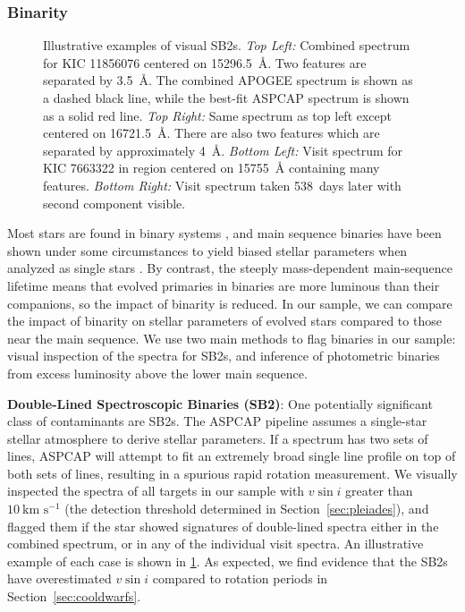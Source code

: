 \documentclass[preprint2]{aastex62}
\newcommand{\vsini}{\ensuremath{v \sin i}}
\newcommand{\kms}{\textrm{km~s}\ensuremath{^{-1}}}
\begin{document}
\subsubsection{Binarity}
\label{sec:binarity}

\begin{figure}[htb]
    \caption{Illustrative examples of visual SB2s. \emph{Top Left:} Combined 
        spectrum for KIC 11856076 centered on 15296.5~\AA{}. Two features are 
        separated by 3.5~\AA{}. The combined APOGEE spectrum is shown as a dashed black line, while the best-fit ASPCAP spectrum is shown as
a solid red line. \emph{Top Right:} Same spectrum as top left except centered on
16721.5~\AA{}. There are also two features which are separated by approximately 
4~\AA{}.  \emph{Bottom Left:} Visit spectrum for KIC 7663322 in region centered 
on 15755~\AA{} containing many features. \emph{Bottom Right:} Visit spectrum 
taken 538~days later with second component visible.}
    \label{fig:sb2diag}
\end{figure}

Most stars are found in binary systems \citep{Moe17}, and main sequence 
binaries have been shown under some circumstances to yield biased stellar 
parameters when analyzed as single stars \citep{ElBadry18a,Simonian19}. By 
contrast, the steeply mass-dependent main-sequence lifetime means that
evolved primaries in binaries are more luminous than their companions, so the
impact of binarity is reduced. In our sample, we can compare the impact of
binarity on stellar parameters of evolved stars compared to those near the main sequence. We use two main methods 
to flag binaries in our
sample: visual inspection of the spectra for SB2s, and inference of photometric binaries from excess luminosity above the lower main sequence.

\textbf{Double-Lined Spectroscopic Binaries (SB2)}: One potentially significant class of contaminants are SB2s. The ASPCAP pipeline assumes a single-star
stellar atmosphere to derive stellar parameters. If a spectrum has two sets of lines, 
ASPCAP will attempt to fit an extremely broad single line profile on top of both sets 
of lines, resulting in a spurious rapid rotation measurement. We visually inspected the 
spectra of all targets in our sample with 
\vsini{} greater than \(10~\kms\) (the detection threshold determined in
Section~\ref{sec:pleiades}), and flagged them if the star showed 
signatures of double-lined spectra
either in the combined spectrum, or in any of the individual visit spectra. 
An illustrative example of each case is shown in \cref{fig:sb2diag}. As expected, we find evidence
that the SB2s have overestimated \vsini{} compared to rotation periods
in Section~\ref{sec:cooldwarfs}.
\end{document}
